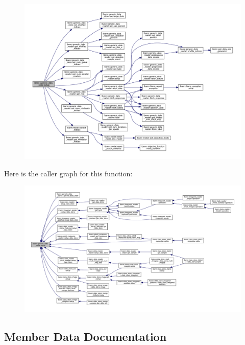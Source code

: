 \begin{figure}[H]
\begin{center}
\leavevmode
\includegraphics[width=350pt]{classlbann_1_1generic__data__store_a1cff17def02ee21b6ca0befeb04bb582_cgraph}
\end{center}
\end{figure}
Here is the caller graph for this function\+:\nopagebreak
\begin{figure}[H]
\begin{center}
\leavevmode
\includegraphics[width=350pt]{classlbann_1_1generic__data__store_a1cff17def02ee21b6ca0befeb04bb582_icgraph}
\end{center}
\end{figure}


\subsection{Member Data Documentation}
\mbox{\label{classlbann_1_1generic__data__store_afd21d4f029e450328f8703dd72702e73}} 
